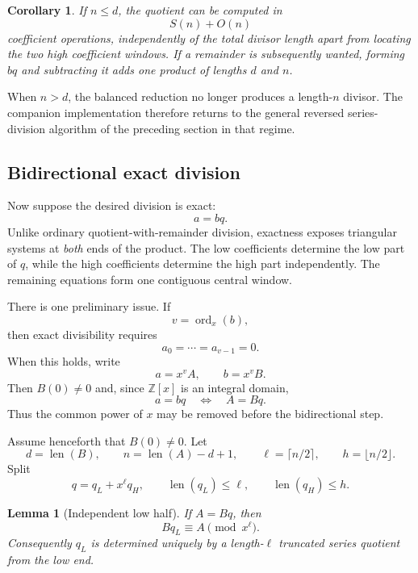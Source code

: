 \documentclass[11pt]{book}
\newtheorem{lemma}[theorem]{Lemma}
\newtheorem{corollary}[theorem]{Corollary}
\theoremstyle{definition}
\newcommand{\ZZ}{\mathbb Z}
\newcommand{\len}{\operatorname{len}}
\begin{document}
\begin{corollary}\label{cor:mulders-unbalanced-complexity}
If $n\leq d$, the quotient can be computed in
\[
 S(n)+O(n)
\]
coefficient operations, independently of the total divisor length apart from
locating the two high coefficient windows.  If a remainder is subsequently
wanted, forming $bq$ and subtracting it adds one product of lengths $d$ and
$n$.
\end{corollary}

When $n>d$, the balanced reduction no longer produces a length-$n$ divisor.
The companion implementation therefore returns to the general reversed
series-division algorithm of the preceding section in that regime.

\subsection{Bidirectional exact division}

Now suppose the desired division is exact:
\begin{equation}\label{eq:exact-division-identity}
 a=bq.
\end{equation}
Unlike ordinary quotient-with-remainder division, exactness exposes triangular
systems at \emph{both} ends of the product.  The low coefficients determine the
low part of $q$, while the high coefficients determine the high part
independently.  The remaining equations form one contiguous central window.

There is one preliminary issue.  If
\[
 v=\operatorname{ord}_x(b),
\]
then exact divisibility requires
\[
 a_0=\cdots=a_{v-1}=0.
\]
When this holds, write
\[
 a=x^vA,
 \qquad
 b=x^vB.
\]
Then $B(0)\ne0$ and, since $\ZZ[x]$ is an integral domain,
\begin{equation}\label{eq:valuation-exact-reduction}
 a=bq
 \quad\Longleftrightarrow\quad
 A=Bq.
\end{equation}
Thus the common power of $x$ may be removed before the bidirectional step.

Assume henceforth that $B(0)\ne0$.  Let
\[
 d=\len(B),
 \qquad
 n=\len(A)-d+1,
 \qquad
 \ell=\lceil n/2\rceil,
 \qquad
 h=\lfloor n/2\rfloor.
\]
Split
\[
 q=q_L+x^\ell q_H,
 \qquad
 \len(q_L)\leq\ell,
 \qquad
 \len(q_H)\leq h.
\]

\begin{lemma}[Independent low half]\label{lem:bidirectional-low}
If $A=Bq$, then
\[
 Bq_L\equiv A\pmod{x^\ell}.
\]
Consequently $q_L$ is determined uniquely by a length-$\ell$ truncated series
quotient from the low end.
\end{lemma}
\end{document}
